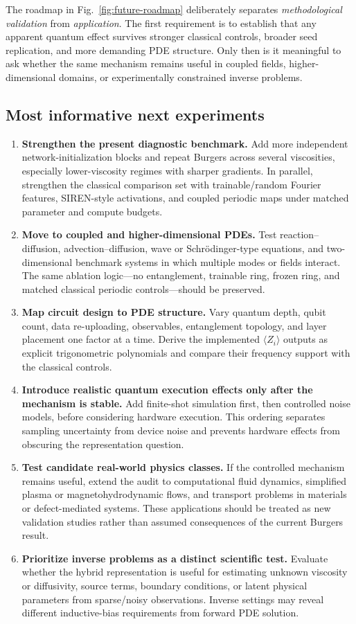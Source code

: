 \documentclass[10pt,a4paper]{article}
\begin{document}
The roadmap in Fig.~\ref{fig:future-roadmap} deliberately separates \emph{methodological validation} from \emph{application}. The first requirement is to establish that any apparent quantum effect survives stronger classical controls, broader seed replication, and more demanding PDE structure. Only then is it meaningful to ask whether the same mechanism remains useful in coupled fields, higher-dimensional domains, or experimentally constrained inverse problems.

\subsection{Most informative next experiments}

\begin{enumerate}
  \item \textbf{Strengthen the present diagnostic benchmark.} Add more independent network-initialization blocks and repeat Burgers across several viscosities, especially lower-viscosity regimes with sharper gradients. In parallel, strengthen the classical comparison set with trainable/random Fourier features, SIREN-style activations, and coupled periodic maps under matched parameter and compute budgets.
  \item \textbf{Move to coupled and higher-dimensional PDEs.} Test reaction--diffusion, advection--diffusion, wave or Schr\"odinger-type equations, and two-dimensional benchmark systems in which multiple modes or fields interact. The same ablation logic---no entanglement, trainable ring, frozen ring, and matched classical periodic controls---should be preserved.
  \item \textbf{Map circuit design to PDE structure.} Vary quantum depth, qubit count, data re-uploading, observables, entanglement topology, and layer placement one factor at a time. Derive the implemented $\langle Z_i\rangle$ outputs as explicit trigonometric polynomials and compare their frequency support with the classical controls.
  \item \textbf{Introduce realistic quantum execution effects only after the mechanism is stable.} Add finite-shot simulation first, then controlled noise models, before considering hardware execution. This ordering separates sampling uncertainty from device noise and prevents hardware effects from obscuring the representation question.
  \item \textbf{Test candidate real-world physics classes.} If the controlled mechanism remains useful, extend the audit to computational fluid dynamics, simplified plasma or magnetohydrodynamic flows, and transport problems in materials or defect-mediated systems. These applications should be treated as new validation studies rather than assumed consequences of the current Burgers result.
  \item \textbf{Prioritize inverse problems as a distinct scientific test.} Evaluate whether the hybrid representation is useful for estimating unknown viscosity or diffusivity, source terms, boundary conditions, or latent physical parameters from sparse/noisy observations. Inverse settings may reveal different inductive-bias requirements from forward PDE solution.
\end{enumerate}
\end{document}
